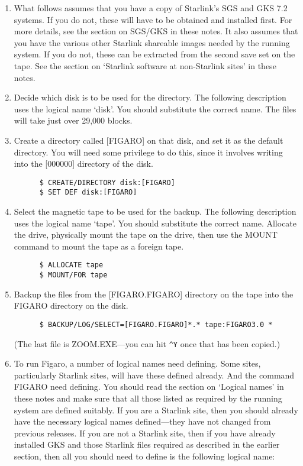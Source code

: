 \begin{enumerate}

\item What follows assumes that you have a copy of Starlink's SGS and GKS  7.2
systems. If you do not, these will have to be obtained and installed first. 
For more details, see the section on SGS/GKS in these notes. It also assumes
that you have the various other Starlink shareable images needed  by the
running system.  If you do not, these can be extracted from the second save set
on the tape.  See the section on `Starlink software at non-Starlink sites' in
these notes.

\item Decide which disk is to be used for the directory.  The following 
description uses the logical name `disk'. You should substitute the correct
name. The files will take just over 29,000 blocks.

\item Create a directory called [FIGARO] on that disk, and set it as the
default directory. You will need some privilege to do this, since it involves
writing into the [000000] directory of the disk.

\begin{verbatim}
      $ CREATE/DIRECTORY disk:[FIGARO]
      $ SET DEF disk:[FIGARO]
\end{verbatim}

\item Select the magnetic tape to be used for the backup. The following 
description uses the logical name `tape'. You should substitute the  correct
name. Allocate the drive, physically mount the tape on the drive, then use the
MOUNT command to mount the tape as a foreign tape.

\begin{verbatim}
      $ ALLOCATE tape
      $ MOUNT/FOR tape
\end{verbatim}

\item Backup the files from the [FIGARO.FIGARO] directory on the tape into
the FIGARO directory on the disk.

\begin{verbatim}
      $ BACKUP/LOG/SELECT=[FIGARO.FIGARO]*.* tape:FIGARO3.0 *
\end{verbatim}
             
(The last file is ZOOM.EXE---you can hit \verb+^Y+ once that has been copied.)

\item To run Figaro, a number of logical names need defining. Some sites, 
particularly Starlink sites, will have these defined already. And the command
FIGARO need defining. You should read the section on `Logical names' in these
notes and make sure that all those listed as required by the running  system
are defined suitably. If you are a Starlink site, then you should already have
the necessary logical names defined---they have not changed from previous
releases. If you are not a Starlink site, then if you have already installed
GKS and those Starlink files required as described in the earlier section, then
all you should need to define is the following logical name:


\end{enumerate}
